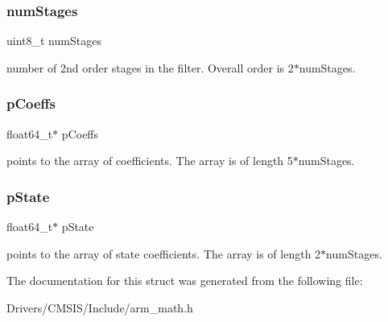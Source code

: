 \subsubsection{\texorpdfstring{num\+Stages}{numStages}}
{\footnotesize\ttfamily uint8\+\_\+t num\+Stages}

number of 2nd order stages in the filter. Overall order is 2$\ast$num\+Stages. \mbox{\label{structarm__biquad__cascade__df2_t__instance__f64_a2f5f42f60a50d7cb39837fd9b80cd8f0}} 
\subsubsection{\texorpdfstring{p\+Coeffs}{pCoeffs}}
{\footnotesize\ttfamily float64\+\_\+t$\ast$ p\+Coeffs}

points to the array of coefficients. The array is of length 5$\ast$num\+Stages. \mbox{\label{structarm__biquad__cascade__df2_t__instance__f64_ae97c926a7e3a4bfe26fcdd0a3cc2f5c6}} 
\subsubsection{\texorpdfstring{p\+State}{pState}}
{\footnotesize\ttfamily float64\+\_\+t$\ast$ p\+State}

points to the array of state coefficients. The array is of length 2$\ast$num\+Stages. 

The documentation for this struct was generated from the following file\+:\begin{DoxyCompactItemize}
\item 
Drivers/\+C\+M\+S\+I\+S/\+Include/arm\+\_\+math.\+h\end{DoxyCompactItemize}
